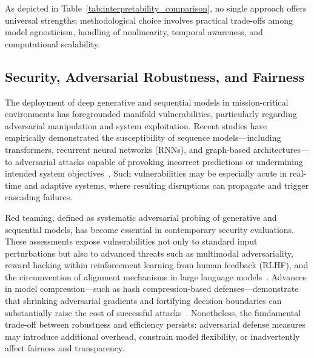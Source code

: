 As depicted in Table~\ref{tab:interpretability_comparison}, no single approach offers universal strengths; methodological choice involves practical trade-offs among model agnosticism, handling of nonlinearity, temporal awareness, and computational scalability.

\subsection{Security, Adversarial Robustness, and Fairness}

The deployment of deep generative and sequential models in mission-critical environments has foregrounded manifold vulnerabilities, particularly regarding adversarial manipulation and system exploitation. Recent studies have empirically demonstrated the susceptibility of sequence models—including transformers, recurrent neural networks (RNNs), and graph-based architectures—to adversarial attacks capable of provoking incorrect predictions or undermining intended system objectives~\cite{ref46}\cite{ref51}\cite{ref69}\cite{ref70}\cite{ref78}. Such vulnerabilities may be especially acute in real-time and adaptive systems, where resulting disruptions can propagate and trigger cascading failures.

Red teaming, defined as systematic adversarial probing of generative and sequential models, has become essential in contemporary security evaluations. These assessments expose vulnerabilities not only to standard input perturbations but also to advanced threats such as multimodal adversariality, reward hacking within reinforcement learning from human feedback (RLHF), and the circumvention of alignment mechanisms in large language models~\cite{ref46}\cite{ref69}\cite{ref78}. Advances in model compression—such as hash compression-based defenses—demonstrate that shrinking adversarial gradients and fortifying decision boundaries can substantially raise the cost of successful attacks~\cite{ref51}. Nonetheless, the fundamental trade-off between robustness and efficiency persists: adversarial defense measures may introduce additional overhead, constrain model flexibility, or inadvertently affect fairness and transparency.

